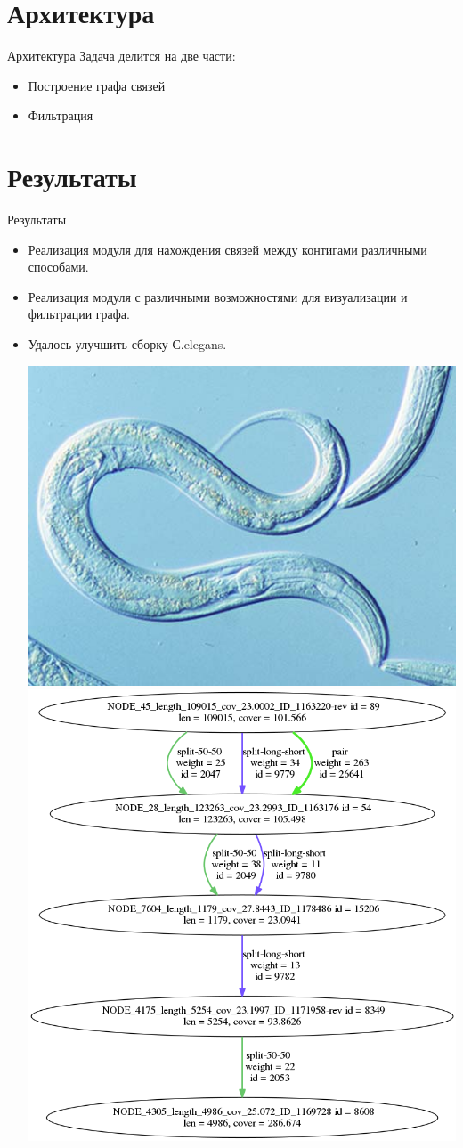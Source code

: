 \documentclass{beamer}
\newcommand{\cimg}[2]{%
	\begin{center}%
		\ifthenelse{\equal{#2}{}}{%
			\texttt{[image: \#1]}
		}{%
			\texttt{[image: \#1]}
		}%
	\end{center}%
}
\begin{document}
\section{Архитектура}
\begin{frame}[t]{Архитектура}
	Задача делится на две части:
	\begin{itemize}
		\item Построение графа связей
		\item Фильтрация
	\end{itemize}	
	\cimg{src.jpg}{0.65}
\end{frame}

\section{Результаты}
\begin{frame}[t]{Результаты}
	\begin{itemize}
		\item Реализация модуля для нахождения связей
		между контигами различными способами. 
		\item Реализация модуля с различными возможностями для 
		визуализации и фильтрации графа. 
		\item Удалось улучшить сборку С.elegans.
		\begin{center}
			\includegraphics[width=0.35\linewidth]{celegans.jpg}
			\includegraphics[width=0.35\linewidth]{celegExmp.png}
		\end{center}
	\end{itemize}
\end{frame}
\end{document}
